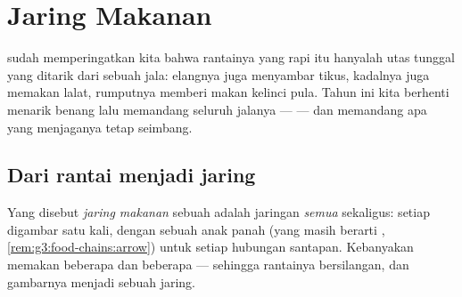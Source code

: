 \chapter{Jaring Makanan}\label{ch:g5:food-webs}

 sudah memperingatkan kita bahwa rantainya
yang rapi itu hanyalah utas tunggal yang ditarik dari sebuah jala:
elangnya juga menyambar tikus, kadalnya juga memakan lalat, rumputnya
memberi makan kelinci pula. Tahun ini kita berhenti menarik benang
lalu memandang seluruh jalanya ---  --- dan memandang
apa yang menjaganya tetap seimbang.

\section{Dari rantai menjadi jaring}

\begin{definition}\label{def:g5:food-webs:web}
Yang disebut \emph{jaring makanan} sebuah
 adalah jaringan \emph{semua}  sekaligus:
setiap  digambar satu kali, dengan sebuah anak panah (yang
masih berarti \emph{},
\cref{rem:g3:food-chains:arrow}) untuk setiap hubungan santapan.
Kebanyakan  memakan beberapa  dan  beberapa
 --- sehingga rantainya bersilangan, dan gambarnya menjadi
sebuah jaring.
\end{definition}

